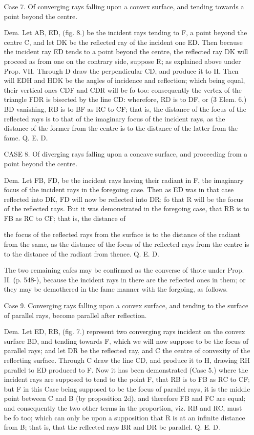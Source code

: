 \documentclass{article}
\begin{document}
Case 7. Of converging rays falling upon a convex surface, and tending towards a point beyond the centre.

Dem. Let AB, ED, (fig. 8.) be the incident rays tending to F, a point beyond the centre C, and let DK be the reflected ray of the incident one ED. Then because the incident ray ED tends to a point beyond the centre, the reflected ray DK will proceed as from one on the contrary side, suppose R; as explained above under Prop. VII. Through D draw the perpendicular CD, and produce it to H. Then will EDH and HDK be the angles of incidence and reflection; which being equal, their vertical ones CDF and CDR will be fo too: consequently the vertex of the triangle FDR is bisected by the line CD: wherefore, RD is to DF, or (3 Elem. 6.) BD vanishing, RB is to BF as RC to CF; that is, the distance of the focus of the reflected rays is to that of the imaginary focus of the incident rays, as the distance of the former from the centre is to the distance of the latter from the fame. Q. E. D.

CASE 8. Of diverging rays falling upon a concave surface, and proceeding from a point beyond the centre.

Dem. Let FB, FD, be the incident rays having their radiant in F, the imaginary focus of the incident rays in the foregoing case. Then as ED was in that case reflected into DK, FD will now be reflected into DR; fo that R will be the focus of the reflected rays. But it was demonstrated in the foregoing case, that RB is to FB as RC to CF; that is, the distance of

the focus of the reflected rays from the surface is to the distance of the radiant from the same, as the distance of the focus of the reflected rays from the centre is to the distance of the radiant from thence. Q. E. D.

The two remaining cafes may be confirmed as the converse of thote under Prop. II. (p. 548-), because the incident rays in there are the reflected ones in them; or they may be demothered in the fame manner with the forgoing, as follows.

Case 9. Converging rays falling upon a convex surface, and tending to the surface of parallel rays, become parallel after reflection.

Dem. Let ED, RB, (fig. 7.) represent two converging rays incident on the convex surface BD, and tending towards F, which we will now suppose to be the focus of parallel rays; and let DR be the reflected ray, and C the centre of convexity of the reflecting surface. Through C draw the line CD, and produce it to H, drawing RH parallel to ED produced to F. Now it has been demonstrated (Case 5.) where the incident rays are supposed to tend to the point F, that RB is to FB as RC to CF; but F in this Case being supposed to be the focus of parallel rays, it is the middle point between C and B (by proposition 2d), and therefore FB and FC are equal; and consequently the two other terms in the proportion, viz. RB and RC, must be fo too; which can only be upon a supposition that R is at an infinite distance from B; that is, that the reflected rays BR and DR be parallel. Q. E. D.
\end{document}
